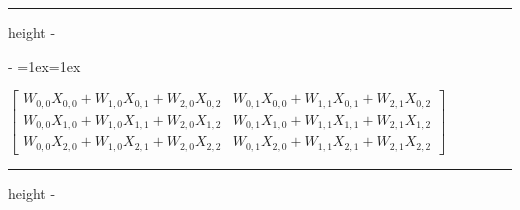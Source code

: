\documentclass[letterpaper,10pt,english]{sphinxmanual}
\makeatletter
\newenvironment{nbsphinxfancyoutput}{%
    \let\sphinxincludegraphics\nbsphinxincludegraphics
    \nbsphinx@image@maxheight\textheight
    \advance\nbsphinx@image@maxheight -2\fboxsep   %
    \advance\nbsphinx@image@maxheight -2\fboxrule  %
    \advance\nbsphinx@image@maxheight -\baselineskip
\def\nbsphinxfcolorbox{\spx@fcolorbox{nbsphinx-code-border}{white}}%
\def\FrameCommand{\nbsphinxfcolorbox\nbsphinxfancyaddprompt\@empty}%
\def\FirstFrameCommand{\nbsphinxfcolorbox\nbsphinxfancyaddprompt\sphinxVerbatim@Continues}%
\def\MidFrameCommand{\nbsphinxfcolorbox\sphinxVerbatim@Continued\sphinxVerbatim@Continues}%
\def\LastFrameCommand{\nbsphinxfcolorbox\sphinxVerbatim@Continued\@empty}%
\MakeFramed{\advance\hsize-\width\@totalleftmargin\z@\linewidth\hsize\@setminipage}%
\lineskip=1ex\lineskiplimit=1ex\raggedright%
}{\par\unskip\@minipagefalse\endMakeFramed}
\def\nbsphinxfancyaddprompt{\ifvoid\nbsphinxpromptbox\else
    \kern\fboxrule\kern\fboxsep
    \copy\nbsphinxpromptbox
    \kern-\ht\nbsphinxpromptbox\kern-\dp\nbsphinxpromptbox
    \kern-\fboxsep\kern-\fboxrule\nointerlineskip
    \fi}
\newlength\nbsphinxcodecellspacing
\newcommand*{\nbsphinxincludegraphics}[2][]{%
    \gdef\spx@includegraphics@options{#1}%
    \setbox\spx@image@box\hbox{\texttt{[image: \#2]}}%
    \in@false
    \ifdim \wd\spx@image@box>\linewidth
      \g@addto@macro\spx@includegraphics@options{,width=\linewidth}%
      \in@true
    \fi
    \ifdim \ht\spx@image@box>\nbsphinx@image@maxheight
      \g@addto@macro\spx@includegraphics@options{,height=\nbsphinx@image@maxheight}%
      \in@true
    \fi
    \ifin@
      \g@addto@macro\spx@includegraphics@options{,keepaspectratio}%
    \fi
    \setbox\spx@image@box\box\voidb@x %
    \expandafter\includegraphics\expandafter[\spx@includegraphics@options]{#2}%
}%
\makeatother
\begin{document}
{
\begin{sphinxVerbatim}[commandchars=\\\{\}]
\llap{\color{nbsphinxin}[12]:\,\hspace{\fboxrule}\hspace{\fboxsep}} 
\end{sphinxVerbatim}
}

\hrule height -\fboxrule\relax
\vspace{\nbsphinxcodecellspacing}

\savebox\nbsphinxpromptbox[0pt][r]{\color{nbsphinxout}\Verb|\strut{[12]:}\,|}

\begin{nbsphinxfancyoutput}
$\displaystyle \left[\begin{array}{cc}W_{0, 0} X_{0, 0} + W_{1, 0} X_{0, 1} + W_{2, 0} X_{0, 2} & W_{0, 1} X_{0, 0} + W_{1, 1} X_{0, 1} + W_{2, 1} X_{0, 2}\\W_{0, 0} X_{1, 0} + W_{1, 0} X_{1, 1} + W_{2, 0} X_{1, 2} & W_{0, 1} X_{1, 0} + W_{1, 1} X_{1, 1} + W_{2, 1} X_{1, 2}\\W_{0, 0} X_{2, 0} + W_{1, 0} X_{2, 1} + W_{2, 0} X_{2, 2} & W_{0, 1} X_{2, 0} + W_{1, 1} X_{2, 1} + W_{2, 1} X_{2, 2}\end{array}\right]$
\end{nbsphinxfancyoutput}

{
\begin{sphinxVerbatim}[commandchars=\\\{\}]
\llap{\color{nbsphinxin}[13]:\,\hspace{\fboxrule}\hspace{\fboxsep}}
   
\end{sphinxVerbatim}
}

\hrule height -\fboxrule\relax
\vspace{\nbsphinxcodecellspacing}

\savebox\nbsphinxpromptbox[0pt][r]{\color{nbsphinxout}\Verb|\strut{[13]:}\,|}
\end{document}
